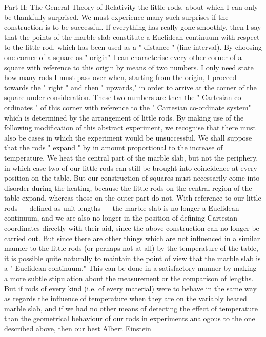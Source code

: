 \documentclass{article}
\begin{document}
Part II: The General Theory of Relativity
the little rods, about which I can only be thankfully surprised. We must experience many
such surprises if the construction is to be successful.
If everything has really gone smoothly, then I say that the points of the marble slab
constitute a Euclidean continuum with respect to the little rod, which has been used as a "
distance " (line-interval). By choosing one corner of a square as " origin" I can characterise
every other corner of a square with reference to this origin by means of two numbers. I only
need state how many rods I must pass over when, starting from the origin, I proceed
towards the " right " and then " upwards," in order to arrive at the corner of the square under
consideration. These two numbers are then the " Cartesian co-ordinates " of this corner with
reference to the " Cartesian co-ordinate system" which is determined by the arrangement of
little rods.
By making use of the following modification of this abstract experiment, we recognise
that there must also be cases in which the experiment would be unsuccessful. We shall
suppose that the rods " expand " by in amount proportional to the increase of temperature.
We heat the central part of the marble slab, but not the periphery, in which case two of our
little rods can still be brought into coincidence at every position on the table. But our
construction of squares must necessarily come into disorder during the heating, because the
little rods on the central region of the table expand, whereas those on the outer part do not.
With reference to our little rods — defined as unit lengths — the marble slab is no longer
a Euclidean continuum, and we are also no longer in the position of defining Cartesian coordinates directly with their aid, since the above construction can no longer be carried out.
But since there are other things which are not influenced in a similar manner to the little
rods (or perhaps not at all) by the temperature of the table, it is possible quite naturally to
maintain the point of view that the marble slab is a " Euclidean continuum." This can be
done in a satisfactory manner by making a more subtle stipulation about the measurement
or the comparison of lengths.
But if rods of every kind (i.e. of every material) were to behave in the same way as
regards the influence of temperature when they are on the variably heated marble slab, and
if we had no other means of detecting the effect of temperature than the geometrical
behaviour of our rods in experiments analogous to the one described above, then our best
Albert Einstein
\end{document}
